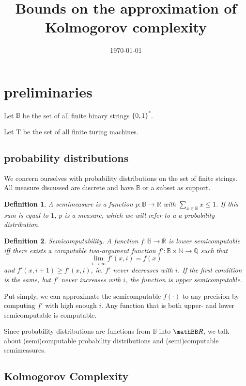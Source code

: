 \documentclass[10pt,a4paper,oneside]{article}
\title{Bounds on the approximation of Kolmogorov complexity}
\date{\today}
\newtheorem{dfn}{Definition}
\begin{document}
\maketitle

\section*{preliminaries}
Let $\mathbb B$ be the set of all finite binary strings $\{0,1\}^*$.

Let {\cal T} be the set of all finite turing machines.

\subsection*{probability distributions}

We concern ourselves with probability distributions on the set of finite strings. All measure discussed are discrete and have $\mathbb B$ or a subset as support.

\begin{dfn}
A \emph{semimeasure} is a function $p : {\mathbb B} \rightarrow {\mathbb R}$ with $\sum_{x \in \mathbb B} x \leq 1$. If this sum is equal to $1$, $p$ is a \emph{measure}, which we will refer to a a probability distribution.
\end{dfn}

\begin{dfn}
Semicomputability. A function $f : {\mathbb B} \rightarrow {\mathbb R}$ is \emph{lower semicomputable} iff there exists a computable two-argument function $f': {\mathbb B} \times {\mathbb N} \rightarrow \mathbb Q$ such that  
\[
\lim_{i \rightarrow \infty} f'(x, i) = f(x)
\] and $f'(x, i + 1) \geq f'(x, i)$, ie. $f'$ never decreases with $i$. If the first condition is the same, but $f'$ never increases with $i$, the function is \emph{upper semicomputable}.
\end{dfn}

Put simply, we can approximate the semicomputable $f(\cdot)$ to any precision by computing $f'$ with high enough $i$. Any function that is both upper- and lower semicomputable is computable.

Since probability distributions are functions from $\mathbb B$ into $\mathBB R$, we talk about (semi)computable probability distributions and (semi)computable semimeasures.

\subsection*{Kolmogorov Complexity}
\end{document}
